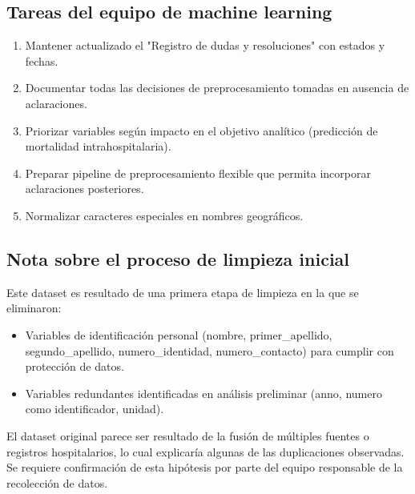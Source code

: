 \documentclass[11pt,a4paper]{article}
\begin{document}
\subsection*{Tareas del equipo de machine learning}
\begin{enumerate}
    \item Mantener actualizado el "Registro de dudas y resoluciones" con estados y fechas.
    \item Documentar todas las decisiones de preprocesamiento tomadas en ausencia de aclaraciones.
    \item Priorizar variables según impacto en el objetivo analítico (predicción de mortalidad intrahospitalaria).
    \item Preparar pipeline de preprocesamiento flexible que permita incorporar aclaraciones posteriores.
    \item Normalizar caracteres especiales en nombres geográficos.
\end{enumerate}


\subsection*{Nota sobre el proceso de limpieza inicial}
Este dataset es resultado de una primera etapa de limpieza en la que se eliminaron:
\begin{itemize}
    \item Variables de identificación personal (nombre, primer\_apellido, segundo\_apellido, numero\_identidad, numero\_contacto) para cumplir con protección de datos.
    \item Variables redundantes identificadas en análisis preliminar (anno, numero como identificador, unidad).
\end{itemize}

El dataset original parece ser resultado de la fusión de múltiples fuentes o registros hospitalarios, lo cual explicaría algunas de las duplicaciones observadas. Se requiere confirmación de esta hipótesis por parte del equipo responsable de la recolección de datos.
\end{document}
